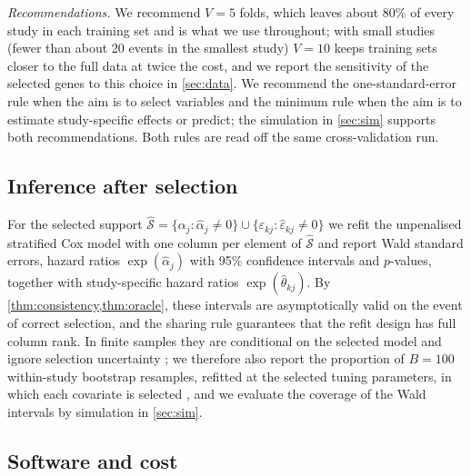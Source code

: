 \documentclass[11pt]{article}
\theoremstyle{remark}
\numberwithin{equation}{section}
\begin{document}
\emph{Recommendations.} We recommend $V=5$ folds, which leaves about 80\% of every
study in each training set and is what we use throughout; with small studies
(fewer than about 20 events in the smallest study) $V=10$ keeps training sets
closer to the full data at twice the cost, and we report the sensitivity of the
selected genes to this choice in \cref{sec:data}. We recommend the
one-standard-error rule when the aim is to select variables and the minimum rule
when the aim is to estimate study-specific effects or predict; the simulation in
\cref{sec:sim} supports both recommendations. Both rules are read off the same
cross-validation run.

\subsection{Inference after selection}
\label{subsec:inference}

For the selected support
$\hat{\mathcal S}=\{\alpha_j:\hat\alpha_j\neq0\}\cup\{\varepsilon_{kj}:\hat\varepsilon_{kj}\ne0\}$
we refit the unpenalised stratified Cox model with one column per element of
$\hat{\mathcal S}$ and report Wald standard errors, hazard ratios
$\exp(\hat\alpha_j)$ with 95\% confidence intervals and $p$-values, together with
study-specific hazard ratios $\exp(\hat\theta_{kj})$. By
\cref{thm:consistency,thm:oracle}, these intervals are asymptotically valid on the
event of correct selection, and the sharing rule guarantees that the refit design
has full column rank. In finite samples they are conditional on the selected model
and ignore selection uncertainty \citep{Berk2013}; we therefore also report the
proportion of $B=100$ within-study bootstrap resamples, refitted at the
selected tuning parameters, in which each covariate is selected
\citep{EfronTibshirani1993, Meinshausen2010}, and we evaluate the coverage of the
Wald intervals by simulation in \cref{sec:sim}.

\subsection{Software and cost}
\label{sec:software}
\end{document}
